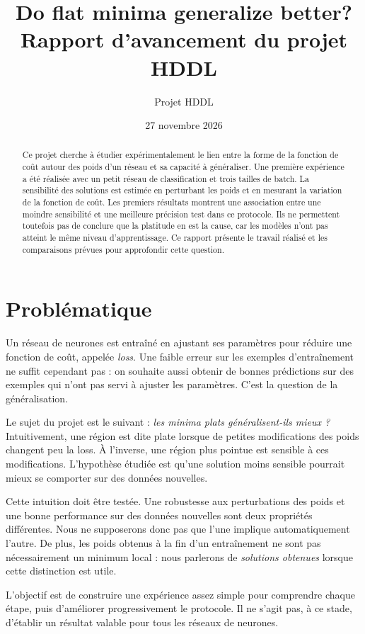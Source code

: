 \documentclass[11pt,a4paper]{article}
\title{Do flat minima generalize better?\\[0.3em]
\large Rapport d'avancement du projet HDDL}
\author{Projet HDDL}
\date{27 novembre 2026}
\begin{document}
\maketitle

\begin{abstract}
Ce projet cherche à étudier expérimentalement le lien entre la forme de la fonction de coût autour des poids d'un réseau et sa capacité à généraliser. Une première expérience a été réalisée avec un petit réseau de classification et trois tailles de batch. La sensibilité des solutions est estimée en perturbant les poids et en mesurant la variation de la fonction de coût. Les premiers résultats montrent une association entre une moindre sensibilité et une meilleure précision test dans ce protocole. Ils ne permettent toutefois pas de conclure que la platitude en est la cause, car les modèles n'ont pas atteint le même niveau d'apprentissage. Ce rapport présente le travail réalisé et les comparaisons prévues pour approfondir cette question.
\end{abstract}

\section{Problématique}

Un réseau de neurones est entraîné en ajustant ses paramètres pour réduire une fonction de coût, appelée \emph{loss}. Une faible erreur sur les exemples d'entraînement ne suffit cependant pas : on souhaite aussi obtenir de bonnes prédictions sur des exemples qui n'ont pas servi à ajuster les paramètres. C'est la question de la généralisation.

Le sujet du projet est le suivant : \emph{les minima plats généralisent-ils mieux ?} Intuitivement, une région est dite plate lorsque de petites modifications des poids changent peu la loss. À l'inverse, une région plus pointue est sensible à ces modifications. L'hypothèse étudiée est qu'une solution moins sensible pourrait mieux se comporter sur des données nouvelles.

Cette intuition doit être testée. Une robustesse aux perturbations des poids et une bonne performance sur des données nouvelles sont deux propriétés différentes. Nous ne supposerons donc pas que l'une implique automatiquement l'autre. De plus, les poids obtenus à la fin d'un entraînement ne sont pas nécessairement un minimum local : nous parlerons de \emph{solutions obtenues} lorsque cette distinction est utile.

L'objectif est de construire une expérience assez simple pour comprendre chaque étape, puis d'améliorer progressivement le protocole. Il ne s'agit pas, à ce stade, d'établir un résultat valable pour tous les réseaux de neurones.
\end{document}
